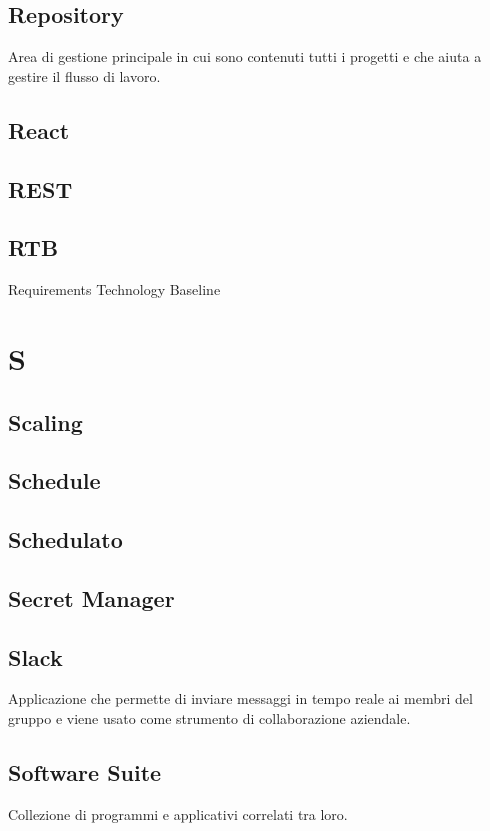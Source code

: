 \documentclass{classes/base}
\begin{document}
        \subsection*{Repository}
        Area di gestione principale in cui sono contenuti tutti i progetti e che aiuta a gestire il flusso di lavoro.
        
        \subsection*{React}
        
        \subsection*{REST}
        
        \subsection*{RTB}
        Requirements Technology Baseline
        \newpage  
    \section*{S}
        \subsection*{Scaling}       

        \subsection*{Schedule} 

        \subsection*{Schedulato}

        \subsection*{Secret Manager}

        \subsection*{Slack} 
        Applicazione che permette di inviare messaggi in tempo reale ai membri del gruppo e viene usato come strumento di collaborazione aziendale.

        \subsection*{Software Suite} 
        Collezione di programmi e applicativi correlati tra loro.
\end{document}
